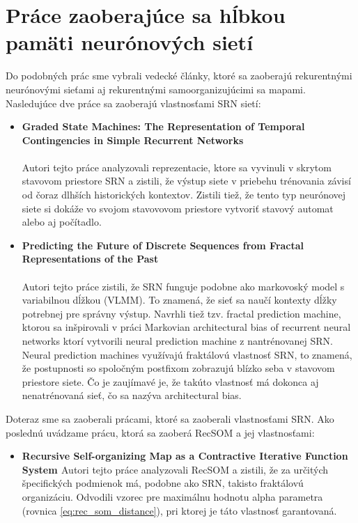 \chapter{Práce zaoberajúce sa hĺbkou pamäti neurónových sietí}

Do podobných prác sme vybrali vedecké články, ktoré sa zaoberajú rekurentnými neurónovými sieťami aj rekurentnými 
samoorganizujúcimi sa mapami.
Nasledujúce dve práce sa zaoberajú vlastnosťami SRN sietí:
\begin{itemize}
    \item \textbf{
        Graded State Machines: The Representation of Temporal Contingencies in Simple Recurrent Networks \cite{Servan-Schreiber1991}}
         \\ \\
    Autori tejto práce analyzovali reprezentacie, 
    ktore sa vyvinuli v skrytom stavovom priestore SRN a zistili, 
    že výstup siete v priebehu trénovania závisí od čoraz dlhších 
    historických kontextov. 
    Zistili tiež, že tento typ neurónovej siete si dokáže 
    vo svojom stavovovom priestore vytvoriť stavový automat alebo aj počítadlo.

    \item \textbf{
        Predicting the Future of Discrete Sequences from Fractal Representations of the Past  \cite{Tino2001}} \\ \\
    Autori tejto práce zistili, že SRN funguje podobne ako markovoský model s variabilnou dĺžkou (VLMM). 
    To znamená, že sieť sa naučí kontexty dĺžky potrebnej pre správny výstup. 
    Navrhli tiež tzv. fractal prediction machine, ktorou sa inšpirovali v práci Markovian architectural bias of recurrent neural networks \cite{markovnian_bias} ktorí vytvorili neural prediction machine z nantrénovanej SRN.
    Neural prediction machines využívajú fraktálovú vlastnosť SRN, to znamená, 
    že postupnosti so spoločným postfixom zobrazujú blízko seba v stavovom priestore siete. 
    Čo je zaujímavé je, že takúto vlastnosť má dokonca aj nenatrénovaná sieť, čo sa nazýva architectural bias.
\end{itemize}

Doteraz sme sa zaoberali prácami, ktoré sa zaoberali vlastnosťami SRN.
Ako poslednú uvádzame prácu, ktorá sa zaoberá RecSOM a jej vlastnosťami:
\begin{itemize}
    \item \textbf{Recursive Self-organizing Map
    as a Contractive Iterative Function System \cite{rsm}}
    Autori tejto práce analyzovali RecSOM a zistili, že za určitých 
    špecifických podmienok má, podobne ako SRN, takisto fraktálovú organizáciu. 
    Odvodili vzorec pre maximálnu hodnotu alpha parametra (rovnica \ref{eq:rec_som_distance}), 
    pri ktorej je táto vlastnosť garantovaná.
\end{itemize}


